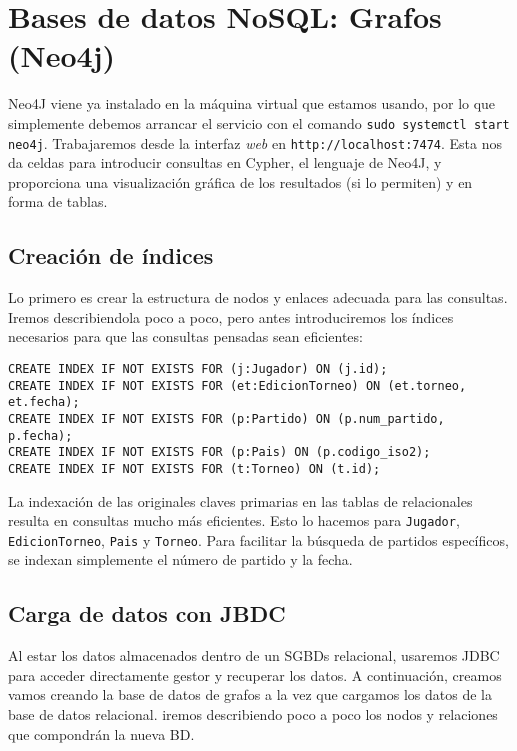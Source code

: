 \section{Bases de datos NoSQL: Grafos (Neo4j)}

Neo4J viene ya instalado en la máquina virtual que estamos usando, por lo que simplemente debemos arrancar el servicio con el comando \texttt{sudo systemctl start neo4j}. Trabajaremos desde la interfaz \textit{web} en \texttt{http://localhost:7474}. Esta nos da celdas para introducir consultas en Cypher, el lenguaje de Neo4J, y proporciona una visualización gráfica de los resultados (si lo permiten) y en forma de tablas. \\

\subsection{Creación de índices}

Lo primero es crear la estructura de nodos y enlaces adecuada para las consultas. Iremos describiendola poco a poco, pero antes introduciremos los índices necesarios para que las consultas pensadas sean eficientes:

\begin{lstlisting}[language=Cypher]
CREATE INDEX IF NOT EXISTS FOR (j:Jugador) ON (j.id);
CREATE INDEX IF NOT EXISTS FOR (et:EdicionTorneo) ON (et.torneo, et.fecha);
CREATE INDEX IF NOT EXISTS FOR (p:Partido) ON (p.num_partido, p.fecha);
CREATE INDEX IF NOT EXISTS FOR (p:Pais) ON (p.codigo_iso2);
CREATE INDEX IF NOT EXISTS FOR (t:Torneo) ON (t.id);
\end{lstlisting}

La indexación de las originales claves primarias en las tablas de relacionales resulta en consultas mucho más eficientes. Esto lo hacemos para \texttt{Jugador}, \texttt{EdicionTorneo}, \texttt{Pais} y \texttt{Torneo}. Para facilitar la búsqueda de partidos específicos, se indexan simplemente el número de partido y la fecha.

\subsection{Carga de datos con JBDC}

Al estar los datos almacenados dentro de un SGBDs relacional, usaremos JDBC para acceder directamente gestor y recuperar los datos. A continuación, creamos vamos creando la base de datos de grafos a la vez que cargamos los datos de la base de datos relacional. iremos describiendo poco a poco los nodos y relaciones que compondrán la nueva BD. \\


